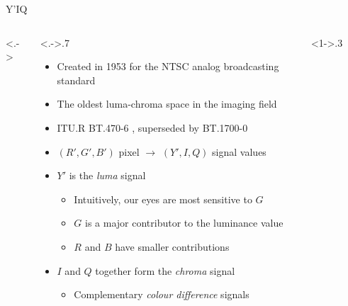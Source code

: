 \documentclass[aspectratio=169,usepdftitle=false]{fireshonks}
\begin{document}
\begin{frame}{Y'IQ}
    \begin{columns}<.->
        \begin{column}<.->{.7\textwidth}
            \begin{itemize}
                \item Created in 1953 for the NTSC analog broadcasting standard
                \item The oldest luma-chroma space in the imaging field
                \item ITU.R BT.470-6 \parencite*{BT470}, superseded by BT.1700-0 \parencite*{BT1700}
                \item $(R', G', B')$ pixel $\rightarrow$ $(Y', I, Q)$ signal values
                \item $Y'$ is the \emph{luma} signal
                      \begin{itemize}
                          \item Intuitively, our eyes are most sensitive to $G$
                          \item $G$ is a major contributor to the luminance value
                          \item $R$ and $B$ have smaller contributions
                      \end{itemize}
                \item $I$ and $Q$ together form the \emph{chroma} signal
                      \begin{itemize}
                          \item Complementary \emph{colour difference} signals
                      \end{itemize}
            \end{itemize}
        \end{column}
        \begin{column}<1->{.3\textwidth}
            \begin{figure}

\end{figure}
\end{column}
\end{columns}
\end{frame}
\end{document}
